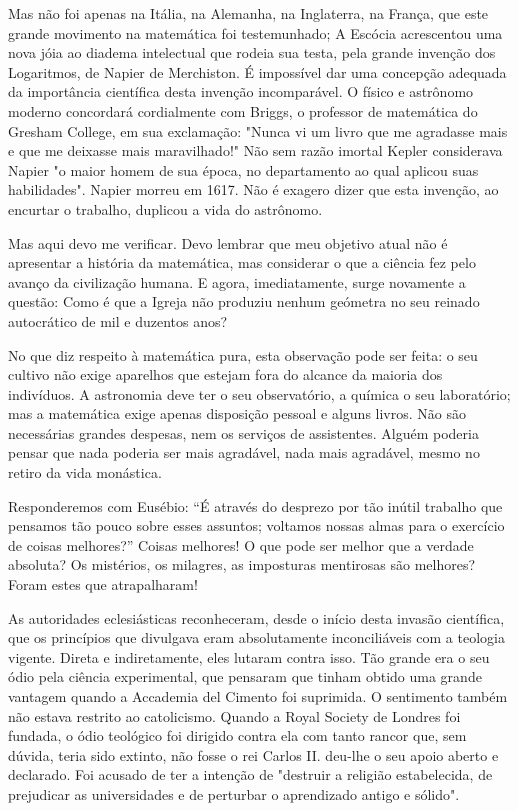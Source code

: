 \documentclass[11pt,a5paper,twoside,openany]{book}
\begin{document}
Mas não foi apenas na Itália, na Alemanha, na Inglaterra, na França, que este grande movimento na matemática foi testemunhado; A Escócia acrescentou uma nova jóia ao diadema intelectual que rodeia sua testa, pela grande invenção dos Logaritmos, de Napier de Merchiston. É impossível dar uma concepção adequada da importância científica desta invenção incomparável. O físico e astrônomo moderno concordará cordialmente com Briggs, o professor de matemática do Gresham College, em sua exclamação: "Nunca vi um livro que me agradasse mais e que me deixasse mais maravilhado!" Não sem razão imortal Kepler considerava Napier "o maior homem de sua época, no departamento ao qual aplicou suas habilidades". Napier morreu em 1617. Não é exagero dizer que esta invenção, ao encurtar o trabalho, duplicou a vida do astrônomo.

Mas aqui devo me verificar. Devo lembrar que meu objetivo atual não é apresentar a história da matemática, mas considerar o que a ciência fez pelo avanço da civilização humana. E agora, imediatamente, surge novamente a questão: Como é que a Igreja não produziu nenhum geómetra no seu reinado autocrático de mil e duzentos anos?

No que diz respeito à matemática pura, esta observação pode ser feita: o seu cultivo não exige aparelhos que estejam fora do alcance da maioria dos indivíduos. A astronomia deve ter o seu observatório, a química o seu laboratório; mas a matemática exige apenas disposição pessoal e alguns livros. Não são necessárias grandes despesas, nem os serviços de assistentes. Alguém poderia pensar que nada poderia ser mais agradável, nada mais agradável, mesmo no retiro da vida monástica.

Responderemos com Eusébio: “É através do desprezo por tão inútil trabalho que pensamos tão pouco sobre esses assuntos; voltamos nossas almas para o exercício de coisas melhores?” Coisas melhores! O que pode ser melhor que a verdade absoluta? Os mistérios, os milagres, as imposturas mentirosas são melhores? Foram estes que atrapalharam!

As autoridades eclesiásticas reconheceram, desde o início desta invasão científica, que os princípios que divulgava eram absolutamente inconciliáveis ​​com a teologia vigente. Direta e indiretamente, eles lutaram contra isso. Tão grande era o seu ódio pela ciência experimental, que pensaram que tinham obtido uma grande vantagem quando a Accademia del Cimento foi suprimida. O sentimento também não estava restrito ao catolicismo. Quando a Royal Society de Londres foi fundada, o ódio teológico foi dirigido contra ela com tanto rancor que, sem dúvida, teria sido extinto, não fosse o rei Carlos II. deu-lhe o seu apoio aberto e declarado. Foi acusado de ter a intenção de "destruir a religião estabelecida, de prejudicar as universidades e de perturbar o aprendizado antigo e sólido".
\end{document}

